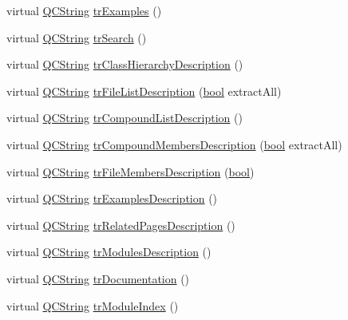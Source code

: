 \begin{DoxyCompactItemize}
\item 
virtual \hyperlink{class_q_c_string}{Q\+C\+String} \hyperlink{class_translator_japanese_a9156009f1d3b6509fea32f5da43ffd66}{tr\+Examples} ()
\item 
virtual \hyperlink{class_q_c_string}{Q\+C\+String} \hyperlink{class_translator_japanese_aa2ecc8562e45c1e8ee020cd2a51923a1}{tr\+Search} ()
\item 
virtual \hyperlink{class_q_c_string}{Q\+C\+String} \hyperlink{class_translator_japanese_af1edda6affca4f6f036214e25b62b830}{tr\+Class\+Hierarchy\+Description} ()
\item 
virtual \hyperlink{class_q_c_string}{Q\+C\+String} \hyperlink{class_translator_japanese_a171ccbfdd6e05fe54ae1ebcb43c19e47}{tr\+File\+List\+Description} (\hyperlink{qglobal_8h_a1062901a7428fdd9c7f180f5e01ea056}{bool} extract\+All)
\item 
virtual \hyperlink{class_q_c_string}{Q\+C\+String} \hyperlink{class_translator_japanese_a90bdebbd4af4fc90cc7d19188a785215}{tr\+Compound\+List\+Description} ()
\item 
virtual \hyperlink{class_q_c_string}{Q\+C\+String} \hyperlink{class_translator_japanese_ada64de6ac856c538fca1420ed6e1ca46}{tr\+Compound\+Members\+Description} (\hyperlink{qglobal_8h_a1062901a7428fdd9c7f180f5e01ea056}{bool} extract\+All)
\item 
virtual \hyperlink{class_q_c_string}{Q\+C\+String} \hyperlink{class_translator_japanese_a4dde09015f9b85617fcc24ff893a085e}{tr\+File\+Members\+Description} (\hyperlink{qglobal_8h_a1062901a7428fdd9c7f180f5e01ea056}{bool})
\item 
virtual \hyperlink{class_q_c_string}{Q\+C\+String} \hyperlink{class_translator_japanese_a64634d888eea387e1678d0c7fbd7e510}{tr\+Examples\+Description} ()
\item 
virtual \hyperlink{class_q_c_string}{Q\+C\+String} \hyperlink{class_translator_japanese_adf7b56555d2ab0c6a0263cdf785ce3f3}{tr\+Related\+Pages\+Description} ()
\item 
virtual \hyperlink{class_q_c_string}{Q\+C\+String} \hyperlink{class_translator_japanese_a055f2850d4543ca3bde12af63114ac78}{tr\+Modules\+Description} ()
\item 
virtual \hyperlink{class_q_c_string}{Q\+C\+String} \hyperlink{class_translator_japanese_abd15dfd03f03cf0b753eeedb43a3b7eb}{tr\+Documentation} ()
\item 
virtual \hyperlink{class_q_c_string}{Q\+C\+String} \hyperlink{class_translator_japanese_afc8dced41f60d8ae454847f48c7fc471}{tr\+Module\+Index} ()

\end{DoxyCompactItemize}
